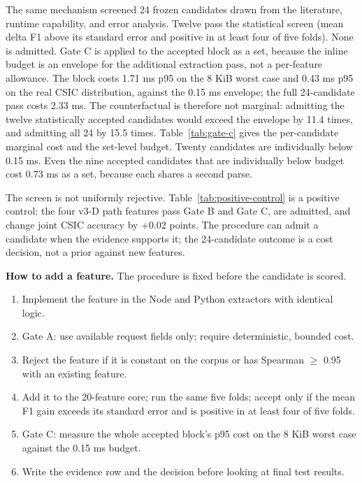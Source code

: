 \documentclass[preprint,11pt]{elsarticle}
\providecommand{\tightlist}{}
\begin{document}
The same mechanism screened 24 frozen candidates drawn from the
literature, runtime capability, and error analysis. Twelve pass the
statistical screen (mean delta F1 above its standard error and positive
in at least four of five folds). None is admitted. Gate C is applied to
the accepted block as a set, because the inline budget is an envelope
for the additional extraction pass, not a per-feature allowance. The
block costs 1.71 ms p95 on the 8 KiB worst case and 0.43 ms p95 on the
real CSIC distribution, against the 0.15 ms envelope; the full
24-candidate pass costs 2.33 ms. The counterfactual is therefore not
marginal: admitting the twelve statistically accepted candidates would
exceed the envelope by 11.4 times, and admitting all 24 by 15.5 times.
Table~\ref{tab:gate-c} gives the per-candidate marginal cost and the set-level budget.
Twenty candidates are individually below 0.15 ms. Even the nine accepted
candidates that are individually below budget cost 0.73 ms as a set,
because each shares a second parse.

The screen is not uniformly rejective. Table~\ref{tab:positive-control} is a positive control:
the four v3-D path features pass Gate B and Gate C, are admitted, and
change joint CSIC accuracy by +0.02 points. The procedure can admit a
candidate when the evidence supports it; the 24-candidate outcome is a
cost decision, not a prior against new features.

\textbf{How to add a feature.} The procedure is fixed before the
candidate is scored.

\begin{enumerate}
\def\labelenumi{\arabic{enumi}.}
\tightlist
\item
  Implement the feature in the Node and Python extractors with identical
  logic.
\item
  Gate A: use available request fields only; require deterministic,
  bounded cost.
\item
  Reject the feature if it is constant on the corpus or has
  \textbar Spearman\textbar{} $\ge$ 0.95 with an existing
  feature.
\item
  Add it to the 20-feature core; run the same five folds; accept only if
  the mean F1 gain exceeds its standard error and is positive in at
  least four of five folds.
\item
  Gate C: measure the whole accepted block's p95 cost on the 8 KiB worst
  case against the 0.15 ms budget.
\item
  Write the evidence row and the decision before looking at final test
  results.
\end{enumerate}
\end{document}
